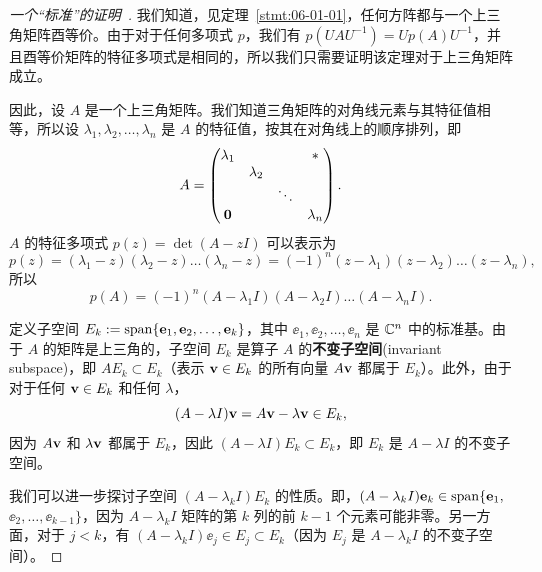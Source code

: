 \begin{proof}[\normalfont\heiti 一个“标准”的证明~\nopunct]
我们知道，见定理~\ref{stmt:06-01-01}，任何方阵都与一个上三角矩阵酉等价。由于对于任何多项式 $p$，我们有 $p(UAU^{-1}) = Up(A)U^{-1}$，并且酉等价矩阵的特征多项式是相同的，所以我们只需要证明该定理对于上三角矩阵成立。

因此，设 $A$ 是一个上三角矩阵。我们知道三角矩阵的对角线元素与其特征值相等，所以设 $\lambda_1, \lambda_2, \dots, \lambda_n$ 是 $A$ 的特征值，按其在对角线上的顺序排列，即
$$A = \begin{pmatrix} \lambda_1 &  & & *\\ & \lambda_2 & & \\ & & \ddots & \\\mathbf{0} & & & \lambda_n \end{pmatrix}.$$
$A$ 的特征多项式 $p(z) = \det(A - zI)$ 可以表示为
$$p(z) = (\lambda_1 - z)(\lambda_2 - z) \dots (\lambda_n - z) = (-1)^n (z - \lambda_1)(z - \lambda_2) \dots (z - \lambda_n),$$
所以
$$p(A) = (-1)^n (A - \lambda_1 I)(A - \lambda_2 I) \dots (A - \lambda_n I).$$


定义子空间 $E_k := \operatorname{span}\{\mathbf{e}_1, \mathbf{e}_2, \dots, \mathbf{e}_k\}$，其中 $\ee_1, \ee_2, \dots, \ee_n$ 是 $\mathbb{C}^n$ 中的标准基。由于 $A$ 的矩阵是上三角的，子空间 $E_k$ 是算子 $A$ 的\textbf{不变子空间}(invariant subspace)，即 $AE_k \subset E_k$（表示 $\mathbf{v} \in E_k$ 的所有向量 $A\mathbf{v}$ 都属于 $E_k$）。此外，由于对于任何 $\mathbf{v} \in E_k$ 和任何 $\lambda$，
$$(A - \lambda I)\mathbf{v} = A\mathbf{v} - \lambda \mathbf{v} \in E_k,$$
因为 $A\mathbf{v}$ 和 $\lambda \mathbf{v}$ 都属于 $E_k$，因此 $(A - \lambda I)E_k \subset E_k$，即 $E_k$ 是 $A - \lambda I$ 的不变子空间。

我们可以进一步探讨子空间 $(A - \lambda_k I)E_k$ 的性质。即，$(A - \lambda_k I)\mathbf{e}_k \in \operatorname{span}\{\mathbf{e}_1,$ $ \ee_2, \dots, \ee_{k-1}\}$，因为 $A - \lambda_k I$ 矩阵的第 $k$ 列的前 $k-1$ 个元素可能非零。另一方面，对于 $j < k$，有 $(A - \lambda_k I)\ee_j \in E_j \subset E_k$（因为 $E_j$ 是 $A - \lambda_k I$ 的不变子空间）。


\end{proof}

